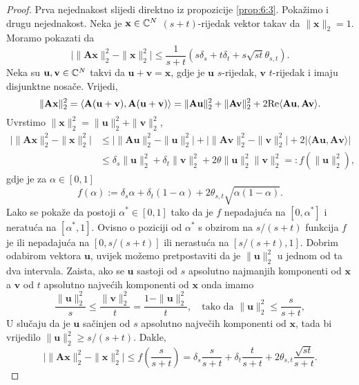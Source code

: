 \documentclass[a4paper,twoside,12pt]{memoir} %
\newcommand{\vect}[1]{\mathbf{#1}}
\renewcommand{\vec}{\vect}
\newcommand{\norm}[1]{\|{#1}\|}
\renewcommand{\Re}{\text{\normalfont{Re}}}
\begin{document}
\begin{proof}
    Prva nejednakost slijedi direktno iz propozicije \ref{prop:6:3}. Poka\v{z}imo i drugu nejednakost. Neka je $\vec x \in \C^N$ $(s+t)$-rijedak vektor takav da $\norm{\vec x}_2 = 1$. Moramo pokazati da
    \begin{equation*}
        \big |\norm{\vec{Ax}}_2^2 - \norm{\vec x}_2^2 \big |  \leq \frac{1}{s+t} (s \delta_s + t \delta_t + s \sqrt{st} \theta_{s,t}).
    \end{equation*}
    Neka su $\vec u, \vec v \in \C^N$ takvi da $\vec u + \vec v = \vec x$, gdje je $\vec u$ $s$-rijedak, $\vec v$ $t$-rijedak i imaju disjunktne nosa\v{c}e. Vrijedi, 
    \begin{equation*}
        \norm{\vec{Ax}}_2^2 = \langle \vec A(\vec u + \vec v) , \vec A(\vec u + \vec v) \rangle = \norm{\vec{Au}}_2^2 + \norm{\vec{Av}}_2^2 + 2 \Re \langle \vec{Au}, \vec{Av} \rangle.
    \end{equation*}
    Uvrstimo $\norm{\vec x}_2^2 = \norm{\vec u}_2^2 + \norm{\vec v}_2^2$,
    \begin{align*}
        \big |\norm{\vec{Ax}}_2^2 - \norm{\vec x}_2^2 \big | &\leq \big |\norm{\vec{Au}}_2^2 - \norm{\vec u }_2^2 \big | + \big |\norm{\vec{Av}}_2^2 - \norm{\vec v}_2^2 \big | + 2 \big |\langle  \vec{Au}, \vec{Av} \rangle \big | \\
        &\leq \delta_s \norm{\vec u }_2^2 + \delta_t \norm{\vec v }_2^2 + 2 \theta \norm{\vec u}_2^2 \norm{\vec v }_2^2 =: f(\norm{\vec u}^2_2),
    \end{align*}
    gdje je za $\alpha \in [0,1]$
    \begin{equation}\label{6:6}
        f(\alpha) := \delta_s \alpha + \delta_t(1-\alpha) + 2 \theta_{s,t} \sqrt{\alpha(1- \alpha)}.
    \end{equation}
    Lako se poka\v{z}e da postoji $\alpha^* \in [0,1]$ tako da je $f$ nepadaju\'ca na $[0, \alpha^*]$ i neratu\'ca na $[\alpha^*, 1]$. Ovisno o poziciji od $\alpha^*$ s obzirom na $s/(s+t)$ funkcija $f$ je ili nepadaju\'ca na $[0, s/(s+t)]$ ili nerastu\'ca na $[s/(s+t), 1]$. Dobrim odabirom vektora $\vec u$, uvijek mo\v{z}emo pretpostaviti da je $\norm{\vec u}_2^2$ u jednom od ta dva intervala. Zaista, ako se $\vec u$ sastoji od $s$ apsolutno najmanjih komponenti od $\vec x$ a $\vec v$ od $t$ apsolutno najve\'cih komponenti od $\vec x$ onda imamo
    \begin{equation*}
        \frac{\norm{\vec u}_2^2}{s} \leq \frac{\norm{\vec v}_2^2}{t} = \frac{1 - \norm{\vec u}_2^2}{t}, \quad \text{tako da } \norm{\vec u}_2^2 \leq \frac{s}{s+t},     
    \end{equation*}
    U slu\v{c}aju da je $\vec u$ sa\v{c}injen od $s$ apsolutno najve\v{c}ih komponenti od $\vec x$, tada bi vrijedilo $\norm{\vec u}_2^2 \geq s/(s+t)$. Dakle, 
    \begin{equation*}
        \big | \norm{\vec{Ax}}_2^2 - \norm{\vec x}_2^2 \big | \leq f(\frac{s}{s+t}) = \delta_s \frac{s}{s+t} + \delta_t \frac{t}{s+t} + 2 \theta_{s,t} \frac{\sqrt{st}}{s+t} .
    \end{equation*}
\end{proof}
\end{document}
